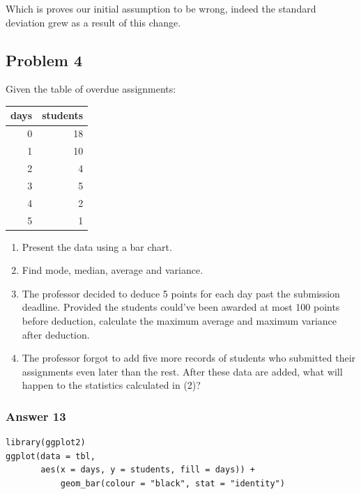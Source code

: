 \documentclass[11pt]{article}
\begin{document}
Which is proves our initial assumption to be wrong, indeed the standard
deviation grew as a result of this change.
\subsection{Problem 4}
\label{sec-1-4}
Given the table of overdue assignments:

\begin{center}
\begin{tabular}{rr}
days & students\\
\hline
0 & 18\\
1 & 10\\
2 & 4\\
3 & 5\\
4 & 2\\
5 & 1\\
\end{tabular}
\end{center}

\begin{enumerate}
\item Present the data using a bar chart.
\item Find mode, median, average and variance.
\item The professor decided to deduce 5 points for each day past the submission
deadline.  Provided the students could've been awarded at most 100 points
before deduction, calculate the maximum average and maximum variance after
deduction.
\item The professor forgot to add five more records of students who submitted
their assignments even later than the rest.  After these data are added,
what will happen to the statistics calculated in (2)?
\end{enumerate}

\subsubsection{Answer 13}
\label{sec-1-4-1}
\lstset{language=R,label=overdue-barchart,numbers=none}
\begin{lstlisting}
library(ggplot2)
ggplot(data = tbl, 
       aes(x = days, y = students, fill = days)) +
           geom_bar(colour = "black", stat = "identity")
\end{lstlisting}
\end{document}
